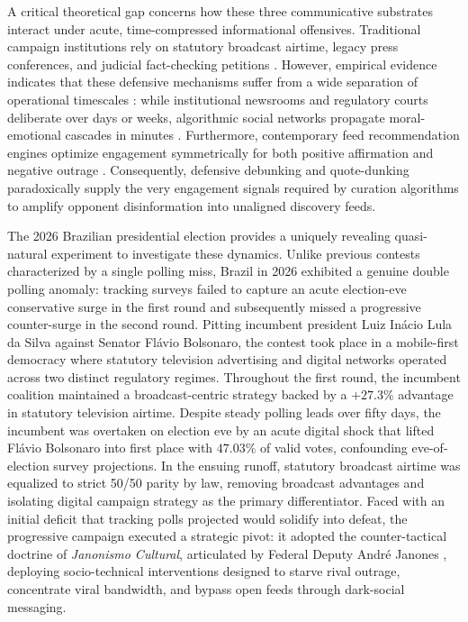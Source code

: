 \documentclass[11pt,a4paper]{article}
\begin{document}
A critical theoretical gap concerns how these three communicative substrates interact under acute, time-compressed informational offensives. Traditional campaign institutions rely on statutory broadcast airtime, legacy press conferences, and judicial fact-checking petitions \citep{gentzkow2006media, chadwick2017hybrid}. However, empirical evidence indicates that these defensive mechanisms suffer from a wide separation of operational timescales \citep{downs1972up, harder2017intermedia}: while institutional newsrooms and regulatory courts deliberate over days or weeks, algorithmic social networks propagate moral-emotional cascades in minutes \citep{brady2017emotion, vosoughi2018spread}. Furthermore, contemporary feed recommendation engines optimize engagement symmetrically for both positive affirmation and negative outrage \citep{crockett2017moral, bail2018exposure}. Consequently, defensive debunking and quote-dunking paradoxically supply the very engagement signals required by curation algorithms to amplify opponent disinformation into unaligned discovery feeds.

The 2026 Brazilian presidential election provides a uniquely revealing quasi-natural experiment to investigate these dynamics. Unlike previous contests characterized by a single polling miss, Brazil in 2026 exhibited a genuine double polling anomaly: tracking surveys failed to capture an acute election-eve conservative surge in the first round and subsequently missed a progressive counter-surge in the second round. Pitting incumbent president Luiz Inácio Lula da Silva against Senator Flávio Bolsonaro, the contest took place in a mobile-first democracy where statutory television advertising and digital networks operated across two distinct regulatory regimes. Throughout the first round, the incumbent coalition maintained a broadcast-centric strategy backed by a $+27.3\%$ advantage in statutory television airtime. Despite steady polling leads over fifty days, the incumbent was overtaken on election eve by an acute digital shock that lifted Flávio Bolsonaro into first place with $47.03\%$ of valid votes, confounding eve-of-election survey projections. In the ensuing runoff, statutory broadcast airtime was equalized to strict 50/50 parity by law, removing broadcast advantages and isolating digital campaign strategy as the primary differentiator. Faced with an initial deficit that tracking polls projected would solidify into defeat, the progressive campaign executed a strategic pivot: it adopted the counter-tactical doctrine of \emph{Janonismo Cultural}, articulated by Federal Deputy André Janones \citep{janones2023janonismo}, deploying socio-technical interventions designed to starve rival outrage, concentrate viral bandwidth, and bypass open feeds through dark-social messaging.
\end{document}
